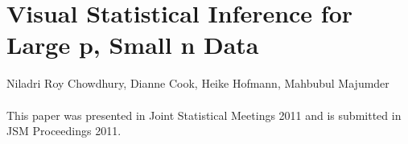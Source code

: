 \documentclass[12]{report}
\begin{document}
%
%
%
%
%
 


\chapter{Visual Statistical Inference for Large p, Small n Data}\label{ch:largepsmalln}
\vspace{-0.8cm}
\large{Niladri Roy Chowdhury, Dianne Cook, Heike Hofmann, Mahbubul Majumder}\\ \\
\large{This paper was presented in Joint Statistical Meetings 2011 and is submitted in JSM Proceedings 2011.} 

\vspace{1cm}

\normalsize
\end{document}
